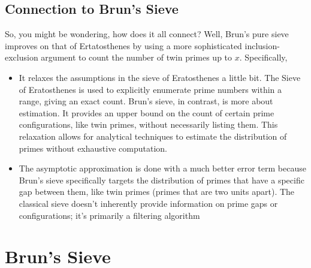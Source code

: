 \subsection{Connection to Brun's Sieve}
So, you might be wondering, how does it all connect? Well, Brun's pure sieve improves on that of Ertatosthenes by using a more sophisticated inclusion-exclusion argument to count the number of twin primes up to $x$. Specifically,
\begin{itemize}
    \item It relaxes the assumptions in the sieve of Eratosthenes a little bit. The Sieve of Eratosthenes is used to explicitly enumerate prime numbers within a range, giving an exact count. Brun's sieve, in contrast, is more about estimation. It provides an upper bound on the count of certain prime configurations, like twin primes, without necessarily listing them. This relaxation allows for analytical techniques to estimate the distribution of primes without exhaustive computation.
    \item The asymptotic approximation is done with a much better error term because Brun's sieve specifically targets the distribution of primes that have a specific gap between them, like twin primes (primes that are two units apart). The classical sieve doesn't inherently provide information on prime gaps or configurations; it's primarily a filtering algorithm
\end{itemize}
\pagebreak
\section{Brun's Sieve}
